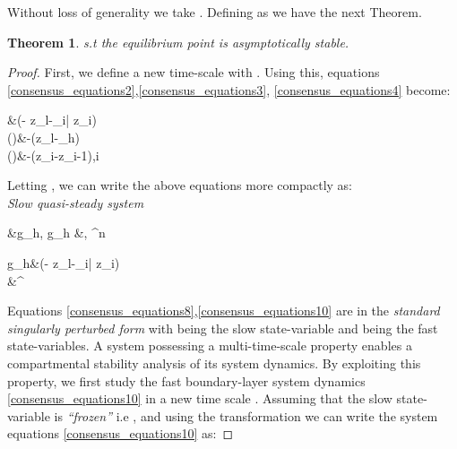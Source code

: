 \documentclass[letterpaper, 10 pt, conference]{ieeeconf}
\newcommand{\matr}[1]{\mathbf{#1}}
\newtheorem{theorem}{\textnormal{\textbf{Theorem}}}
\begin{document}
Without loss of generality we take . Defining  as   we have the next Theorem.
\begin{theorem}
 s.t   the equilibrium point  is \textit{asymptotically stable}.
\end{theorem}
\begin{proof}
 First, we define a new time-scale  with . Using this, equations \eqref{consensus_equations2},\eqref{consensus_equations3}, \eqref{consensus_equations4} become:

&\triangleq(- z_l-\sum_{i\in \bar{}}  z_i)
\label{consensus_equations5}\\
\Big(\Big)&\triangleq-(z_l-\xi_h)
\label{consensus_equations6}\\
\Big(\Big)&\triangleq-(z_i-z_{i-1}),\qquad i\in{}
\label{consensus_equations7}

 Letting  , we can write the above equations more compactly as:\\
 \textit{Slow quasi-steady system}

&\triangleq g_h,\hspace{5mm} g_h\in{}
\label{consensus_equations8}
\varepsilon \frac{\matr{dz}}{\matr{d}\bm{\tau}}&\triangleq\matr{g},\hspace{5mm} \matr{g}\in{}^n
\label{consensus_equations10}

 g_h&\triangleq(- z_l-\sum_{i\in \bar{}}  z_i)\nonumber \\
 \matr{g}&^\top

 Equations \eqref{consensus_equations8},\eqref{consensus_equations10} are in the \textit{standard singularly perturbed form} \cite{khalil} with   being the slow state-variable and  being the fast state-variables. A system possessing a multi-time-scale property enables a compartmental  stability analysis of its system dynamics. By exploiting this property, we first study the fast boundary-layer system dynamics \eqref{consensus_equations10} in a new time scale . Assuming that the slow state-variable  is \textit{``frozen''} i.e , and using the transformation  we can write the system equations \eqref{consensus_equations10} as:


\end{proof}
\end{document}
